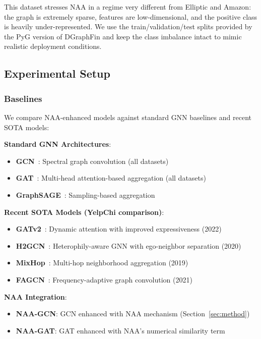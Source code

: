 This dataset stresses NAA in a regime very different from Elliptic and
Amazon: the graph is extremely sparse, features are low-dimensional, and
the positive class is heavily under-represented. We use the train/validation/test
splits provided by the PyG version of DGraphFin and keep the class
imbalance intact to mimic realistic deployment conditions.

\subsection{Experimental Setup}

\subsubsection{Baselines}

We compare NAA-enhanced models against standard GNN baselines and recent SOTA models:

\textbf{Standard GNN Architectures}:
\begin{itemize}
\item \textbf{GCN}~\cite{kipf2017gcn}: Spectral graph convolution (all datasets)
\item \textbf{GAT}~\cite{velivckovic2018gat}: Multi-head attention-based aggregation (all datasets)
\item \textbf{GraphSAGE}~\cite{hamilton2017graphsage}: Sampling-based aggregation
\end{itemize}

\textbf{Recent SOTA Models (YelpChi comparison)}:
\begin{itemize}
\item \textbf{GATv2}~\cite{brody2022gatv2}: Dynamic attention with improved expressiveness (2022)
\item \textbf{H2GCN}~\cite{zhu2020beyond}: Heterophily-aware GNN with ego-neighbor separation (2020)
\item \textbf{MixHop}~\cite{abu2019mixhop}: Multi-hop neighborhood aggregation (2019)
\item \textbf{FAGCN}~\cite{bo2021beyond}: Frequency-adaptive graph convolution (2021)
\end{itemize}

\textbf{NAA Integration}:
\begin{itemize}
\item \textbf{NAA-GCN}: GCN enhanced with NAA mechanism (Section~\ref{sec:method})
\item \textbf{NAA-GAT}: GAT enhanced with NAA's numerical similarity term
\end{itemize}

